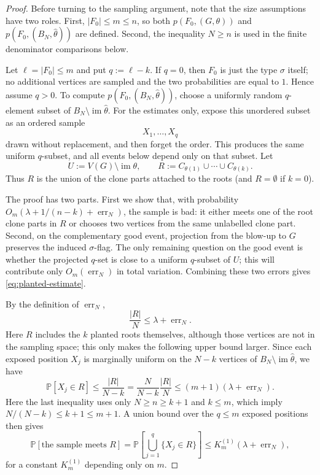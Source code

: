 \documentclass[11pt]{article}
\theoremstyle{definition}
\newcommand{\Prob}{\mathbb{P}}
\begin{document}
\begin{proof}
Before turning to the sampling argument, note that the size assumptions have two
roles.  First, $|F_0|\le m\le n$, so both
$p(F_0,(G,\theta))$ and $p(F_0,(B_N,\widehat\theta))$ are defined.  Second, the
inequality $N\ge n$ is used in
the finite denominator comparisons below.

Let $\ell=|F_0|\le m$ and put $q:=\ell-k$.  If $q=0$, then $F_0$ is just the
type $\sigma$ itself; no additional vertices are sampled and the two
probabilities are equal to $1$.  Hence assume $q>0$.  To compute
$p(F_0,(B_N,\widehat\theta))$, choose a uniformly random $q$-element subset of
$B_N\setminus\operatorname{im}\widehat\theta$.  For the estimates only, expose
this unordered subset as an ordered sample
\[
  X_1,\ldots,X_q
\]
drawn without replacement, and then forget the order.  This produces the same
uniform $q$-subset, and all events below depend only on that subset.  Let
\[
  U:=V(G)\setminus\operatorname{im}\theta,
  \qquad
  R:=C_{\theta(1)}\cup\cdots\cup C_{\theta(k)} .
\]
Thus $R$ is the union of the clone parts attached to the roots
(and $R=\emptyset$ if $k=0$).

The proof has two parts.  First we show that, with probability
$O_m(\lambda+1/(n-k)+\operatorname{err}_N)$, the sample is bad: it either meets
one of the root clone parts in $R$ or chooses two vertices from the same
unlabelled clone part.  Second, on the complementary good event, projection
from the blow-up to $G$ preserves the induced $\sigma$-flag.  The only remaining
question on the good event is whether the projected $q$-set is close to a
uniform $q$-subset of $U$; this will contribute only
$O_m(\operatorname{err}_N)$ in total variation.  Combining these two errors gives
\eqref{eq:planted-estimate}.

By the definition of $\operatorname{err}_N$,
\[
  \frac{|R|}{N}\le \lambda+\operatorname{err}_N .
\]
Here $R$ includes the $k$ planted roots themselves, although those
vertices are not in the sampling space; this only makes the following upper
bound larger.
Since each exposed position $X_j$ is marginally uniform on the
$N-k$ vertices of $B_N\setminus\operatorname{im}\widehat\theta$, we have
\[
  \Prob[X_j\in R]
  \le
  \frac{|R|}{N-k}
  =
  \frac{N}{N-k}\frac{|R|}{N}
  \le
  (m+1)(\lambda+\operatorname{err}_N).
\]
Here the last inequality uses only $N\ge n\ge k+1$ and $k\le m$, which imply
$N/(N-k)\le k+1\le m+1$.  A union bound over the $q\le m$ exposed positions then gives
\[
  \Prob[\text{the sample meets }R]
  =
  \Prob\!\left[\bigcup_{j=1}^q\{X_j\in R\}\right]
  \le
  K_m^{(1)}(\lambda+\operatorname{err}_N),
\]
for a constant $K_m^{(1)}$ depending only on $m$.


\end{proof}
\end{document}
